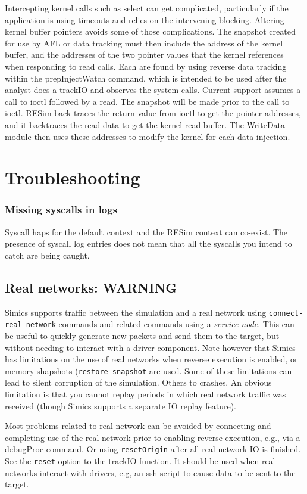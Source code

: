 \documentclass[titlepage]{article}
\begin{document}
\begin{appendices}
Intercepting kernel calls such as select can get complicated, particularly if the application is using timeouts and relies
on the intervening blocking.  Altering kernel buffer pointers avoids some of those complications.  The snapshot created
for use by AFL or data tracking must then include the address of the kernel buffer, and the addresses of the two pointer
values that the kernel references when responding to read calls.  Each are found by using reverse data tracking within the
prepInjectWatch command, which is intended to be used after the analyst does a trackIO and observes the system calls.
Current support assumes a call to ioctl followed by a read.  The snapshot will be made prior to the call to ioctl.  RESim
back traces the return value from ioctl to get the pointer addresses, and it backtraces the read data to get the kernel
read buffer.  The WriteData module then uses these addresses to modify the kernel for each data injection.


\section{Troubleshooting}
\subsubsection{Missing syscalls in logs}
Syscall haps for the default context and the RESim context can co-exist.  The presence of syscall log entries does not
mean that all the syscalls you intend to catch are being caught.

\subsection{Real networks: WARNING}
\label{real-networks}
Simics supports traffic between the simulation and a real network using {\tt connect-real-network} commands and related commands using a \textit{service node}.
This can be useful to quickly generate new packets and send them to the target, but without needing to interact with a driver component.
Note however that Simics has limitations on the use of real networks when reverse execution is enabled, or memory shapshots ({\tt restore-snapshot} are used.  
Some of these limitations can lead to silent corruption
of the simulation.  Others to crashes.  An obvious limitation is that you cannot replay periods in which real network traffic was received (though Simics supports a separate IO replay feature).

Most problems related to real network can be avoided by connecting and completing use of the real network prior to enabling reverse execution, e.g., via a debugProc command.  Or using
{\tt resetOrigin} after all real-network IO is finished.  See the {\tt reset} option to the trackIO function.  It should be used when real-networks interact with drivers, e.g, an ssh
script to cause data to be sent to the target.


\end{appendices}
\end{document}
